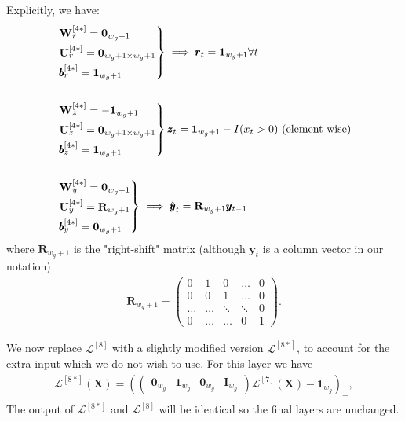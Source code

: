 \documentclass{somasmsc}
\begin{document}
Explicitly, we have:
\begin{align*}
&\begin{rcases}
    \mathbf{W}^{\left[4*\right]}_r = \mathbf{0}_{w_g+1} \\
    \mathbf{U}^{\left[4*\right]}_r = \mathbf{0}_{w_g+1 \times w_g+1} \\
    \pmb{b}^{\left[4*\right]}_r = \mathbf{1}_{w_g+1}
\end{rcases} \implies \pmb{r}_t = \mathbf{1}_{w_g+1} \forall t \\
\\
&\begin{rcases}
    \mathbf{W}^{\left[4*\right]}_z = -\mathbf{1}_{w_g+1} \\
    \mathbf{U}^{\left[4*\right]}_z = \mathbf{0}_{w_g+1 \times w_g+1} \\
    \pmb{b}^{\left[4*\right]}_z = \mathbf{1}_{w_g+1}
\end{rcases} \pmb{z}_t = \mathbf{1}_{w_g+1} - I(x_t > 0) \text{ (element-wise)} \\
\\
&\begin{rcases}
    \mathbf{W}^{\left[4*\right]}_y = \mathbf{0}_{w_g+1} \\
    \mathbf{U}^{\left[4*\right]}_y = \mathbf{R}_{w_g+1} \\
    \pmb{b}^{\left[4*\right]}_y = \mathbf{0}_{w_g+1}
\end{rcases} \implies \hat{\pmb{y}}_t = \mathbf{R}_{w_g+1} \pmb{y}_{t-1}
\end{align*}
where $\mathbf{R}_{w_g+1}$ is the "right-shift" matrix (although $\pmb{y}_t$ is a column vector in our notation)
\begin{align*}
\mathbf{R}_{w_g+1} =
\begin{pmatrix}
    0 & 1 & 0 & \dots & 0 \\
    0 & 0 & 1 & \dots & 0 \\
    \dots & \dots & \ddots & \ddots & 0 \\
    0 & \dots & \dots & 0 & 1
\end{pmatrix}.
\end{align*}

We now replace $\mathcal{L}^{\left[8\right]}$ with a slightly modified version $\mathcal{L}^{\left[8*\right]}$, to account for the extra input which we do not wish to use. For this layer we have
\begin{align*}
\mathcal{L}^{\left[8*\right]}\left(\mathbf{X}\right) = \left(
\begin{pmatrix}
    \mathbf{0}_{w_g} & \mathbf{1}_{w_g} & \mathbf{0}_{w_g} & \mathbf{I}_{w_g}
\end{pmatrix}
\mathcal{L}^{\left[7\right]}\left(\mathbf{X}\right)
- \mathbf{1}_{w_g}\right)_+,
\end{align*}
The output of $\mathcal{L}^{\left[8*\right]}$ and $\mathcal{L}^{\left[8\right]}$ will be identical so the final layers are unchanged.
\end{document}
